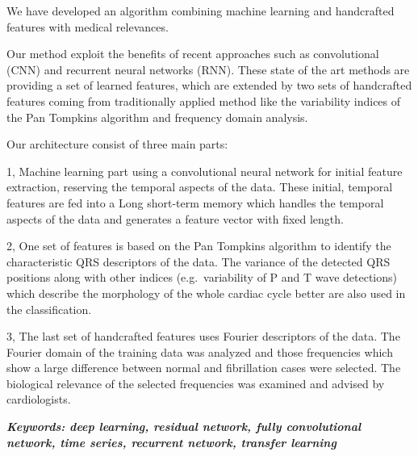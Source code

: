 We have developed an algorithm combining machine learning and handcrafted
features with medical relevances.

Our method exploit the benefits of recent approaches such as convolutional (CNN) and recurrent neural networks (RNN).
These state of the art methods are providing a set of learned features, which are extended by two sets of handcrafted features coming from traditionally applied method like the variability indices of the Pan Tompkins algorithm and frequency domain analysis.



Our architecture consist of three main parts:

1, Machine learning part using a
convolutional neural network for initial feature extraction, reserving the
temporal aspects of the data. These initial, temporal features are fed into a
Long short-term memory which handles the temporal aspects of the data and
generates a feature vector with fixed length.

2, One set of features is based on the Pan Tompkins algorithm to identify the
characteristic QRS descriptors of the data. The variance of the detected QRS
positions along with other indices (e.g.\ variability of P and T wave
detections) which describe the morphology of the whole cardiac cycle better are
also used in the classification.

3, The last set of handcrafted features uses Fourier descriptors of the data.
The Fourier domain of the training data was analyzed and those frequencies which
show a large difference between normal and fibrillation cases were selected. The
biological relevance of the selected frequencies was examined and advised by
cardiologists.
%

\textit{\textbf{Keywords: deep learning, residual network, fully convolutional network, time series, recurrent network, transfer learning}}
